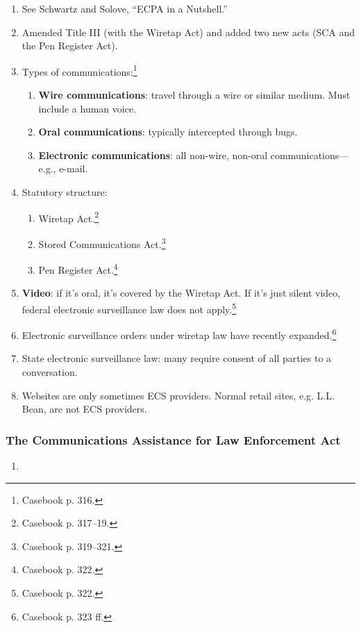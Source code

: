 \begin{enumerate}
    \item See Schwartz and Solove, ``ECPA in a Nutshell.''
    \item Amended Title III (with the Wiretap Act) and added two new acts (SCA 
    and the Pen Register Act).
    \item Types of communications:\footnote{Casebook p. 316.}
    \begin{enumerate}
        \item \textbf{Wire communications}: travel through a wire or similar 
        medium. Must include a human voice.
        \item \textbf{Oral communications}: typically intercepted through 
        bugs.
        \item \textbf{Electronic communications}: all non-wire, non-oral 
        communications---e.g., e-mail. 
    \end{enumerate}
    \item Statutory structure:
    \begin{enumerate}
        \item Wiretap Act.\footnote{Casebook p. 317--19.}
        \item Stored Communications Act.\footnote{Casebook p. 319--321.}
        \item Pen Register Act.\footnote{Casebook p. 322.}
    \end{enumerate}
    \item \textbf{Video}: if it's oral, it's covered by the Wiretap Act. If 
    it's just silent video, federal electronic surveillance law does not 
    apply.\footnote{Casebook p. 322.}
    \item Electronic surveillance orders under wiretap law have recently 
    expanded.\footnote{Casebook p. 323 ff.}
    \item State electronic surveillance law: many require consent of all 
    parties to a conversation.
    \item Websites are only sometimes ECS providers. Normal retail sites, e.g. 
    L.L. Bean, are not ECS providers.
\end{enumerate}

\subsubsection{The Communications Assistance for Law Enforcement Act}

\begin{enumerate}
    \item %
\end{enumerate}

